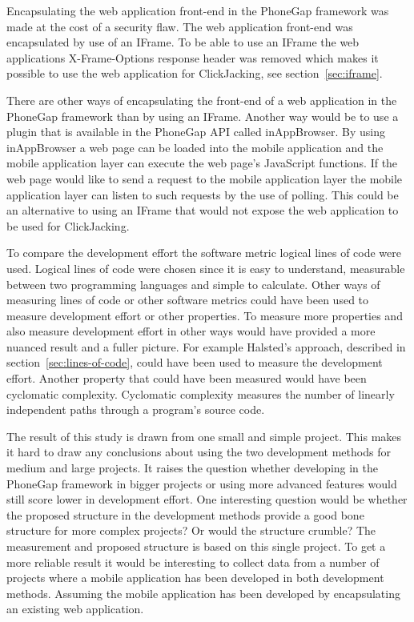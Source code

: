 Encapsulating the web application front-end in the PhoneGap framework was made at the cost of a security flaw. The web application front-end was encapsulated by use of an IFrame. To be able to use an IFrame the web applications X-Frame-Options response header was removed which makes it possible to use the web application for ClickJacking, see section~\ref{sec:iframe}. 

There are other ways of encapsulating the front-end of a web application in the PhoneGap framework than by using an IFrame. Another way would be to use a plugin that is available in the PhoneGap API called inAppBrowser. By using inAppBrowser a web page can be loaded into the mobile application and the mobile application layer can execute the web page’s JavaScript functions. If the web page would like to send a request to the mobile application layer the mobile application layer can listen to such requests by the use of polling.  This could be an alternative to using an IFrame that would not expose the web application to be used for ClickJacking. 

To compare the development effort the software metric logical lines of code were used. Logical lines of code were chosen since it is easy to understand, measurable between two programming languages and simple to calculate. Other ways of measuring lines of code or other software metrics could have been used to measure development effort or other properties. To measure more properties and also measure development effort in other ways would have provided a more nuanced result and a fuller picture. For example Halsted's approach, described in section~\ref{sec:lines-of-code}, could have been used to measure the development effort. Another property that could have been measured would have been cyclomatic complexity. Cyclomatic complexity measures the number of linearly independent paths through a program’s source code. 

The result of this study is drawn from one small and simple project. This makes it hard to draw any conclusions about using the two development methods for medium and large projects. It raises the question whether developing in the PhoneGap framework in bigger projects or using more advanced features would still score lower in development effort. One interesting question would be whether the proposed structure in the development methods provide a good bone structure for more complex projects? Or would the structure crumble? The measurement and proposed structure is based on this single project. To get a more reliable result it would be interesting to collect data from a number of projects where a mobile application has been developed in both development methods. Assuming the mobile application has been developed by encapsulating an existing web application.  


